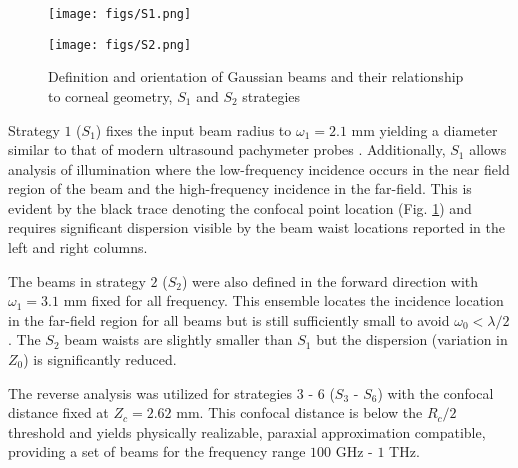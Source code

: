 \documentclass{osa-article}
\begin{document}
\begin{figure}[t]
\centering
\texttt{[image: figs/S1.png]}
\vspace*{-7 mm}

\texttt{[image: figs/S2.png]}
\caption{Definition and orientation of Gaussian beams and their relationship to corneal geometry, $S_1$ and $S_2$ strategies}\label{s12}
\end{figure}

Strategy $1$ ($S_1$) fixes the input beam radius to $\omega_1=2.1$ mm yielding a diameter similar to that of modern ultrasound pachymeter probes \cite{pach}. Additionally, $S_1$ allows analysis of illumination where the low-frequency incidence occurs in the near field region of the beam and the high-frequency incidence in the far-field. This is evident by the black trace denoting the confocal point location (Fig. \ref{s12}) and requires significant dispersion visible by the beam waist locations reported in the left and right columns.

The beams in strategy $2$ ($S_2$) were also defined in the forward direction with $\omega_1 = 3.1$ mm fixed for all frequency. This ensemble locates the incidence location in the far-field region for all beams but is still sufficiently small to avoid $\omega_0< \lambda/2$. The $S_2$ beam waists are slightly smaller than $S_1$ but the dispersion (variation in $Z_0$) is significantly reduced.

The reverse analysis was utilized for strategies $3$ - $6$ ($S_3$ - $S_6$) with the confocal distance fixed at $Z_c = 2.62$ mm. This confocal distance is below the $R_c/2$ threshold and yields physically realizable, paraxial approximation compatible, providing a set of beams for the frequency range $100$ GHz - $1$ THz. 
\end{document}

